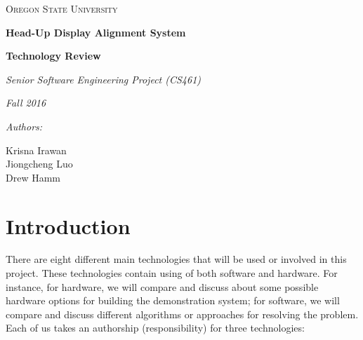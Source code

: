 \documentclass[letterpaper,10pt,onecolumn]{IEEEtran}
\def\name{Krisna Irawan\\ Jiongcheng Luo\\ Drew Hamm}
\def\doc{Technology Review}
\begin{document}
\begin{titlepage}
	\centering
	{\scshape\LARGE Oregon State University\par}
	\vspace{2cm}
	{\huge\bfseries Head-Up Display Alignment System\par}
	\vspace{1cm}
	{\Large\bfseries \doc\par}
	\vspace{1cm}
	{\Large\itshape Senior Software Engineering Project (CS461)\par}
	{\Large\itshape Fall 2016\par}
	\vspace{1cm}
	{\normalsize\itshape Authors:\par}
	{\normalsize \name\par}
	\vspace{1cm}
	\vspace{3cm}


	\begin{abstract}
		This project is a proof concept to explore a potential technological innovation for Head-Up Display (HUD) system that present critical flight information to pilots.
		The primary objective of this project is to reduce the cost and time required to precisely align flight information to the HUD by introducing additional sensor to the system to make the alignment process more dynamic.
		To achieve this goal, there are eight different main technologies that will be critical for the development of the project. This document will compare three alternative options for each main technologies.
		This document will also include the option that we choose for each main technologies to develop this project. 

	\end{abstract}
\end{titlepage}
\tableofcontents

\newpage
\section{Introduction}
There are eight different main technologies that will be used or involved in this project.
These technologies contain using of both software and hardware.
For instance, for hardware, we will compare and discuss about some possible hardware options for building the demonstration system; for software, we will compare and discuss different algorithms or approaches for resolving the problem.
Each of us takes an authorship (responsibility) for three technologies:\\
\end{document}
